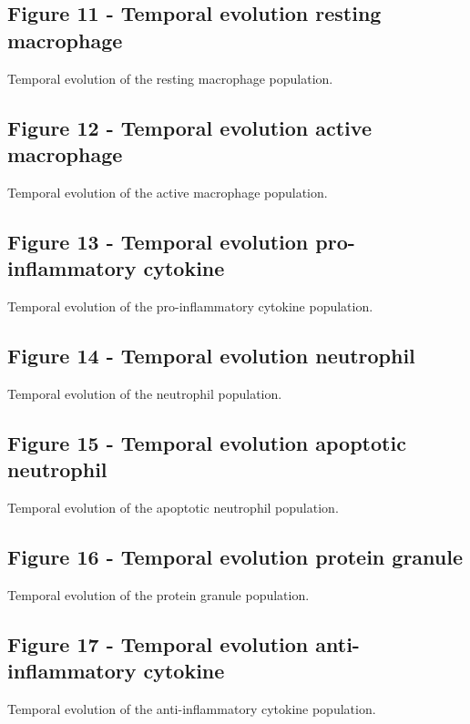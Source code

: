 \documentclass[10pt]{bmc_article}
\newenvironment{bmcformat}{\baselineskip20pt\sloppy\setboolean{publ}{false}}{\baselineskip20pt\sloppy}
\begin{document}
\begin{bmcformat}
\subsection*{Figure 11 - Temporal evolution resting macrophage}
Temporal evolution of the resting macrophage population.

\subsection*{Figure 12 - Temporal evolution active macrophage}
Temporal evolution of the active macrophage population.

\subsection*{Figure 13 - Temporal evolution pro-inflammatory cytokine}
Temporal evolution of the pro-inflammatory cytokine population.

\subsection*{Figure 14 - Temporal evolution neutrophil}
Temporal evolution of the neutrophil population.

\subsection*{Figure 15 - Temporal evolution apoptotic neutrophil}
Temporal evolution of the apoptotic neutrophil population.

\subsection*{Figure 16 - Temporal evolution protein granule}
Temporal evolution of the protein granule population.

\subsection*{Figure 17 - Temporal evolution anti-inflammatory cytokine}
Temporal evolution of the anti-inflammatory cytokine population.



\end{bmcformat}
\end{document}
